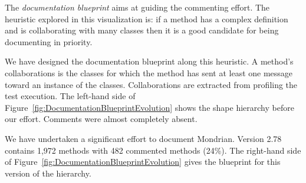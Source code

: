 \documentclass[runningheads]{llncs}
\newcommand{\figref}[1]{Figure~\ref{fig:#1}}
\newcommand{\tablabel}[1]{\label{tab:#1}}
\begin{document}
The \emph{documentation blueprint} aims at guiding the commenting effort. The heuristic explored in this visualization is: if a method has a complex definition and is collaborating with many classes then it is a good candidate for being documenting in priority.

We have designed the documentation blueprint along this heuristic. A method's collaborations is the classes for which the method has sent at least one message toward an instance of the classes. Collaborations are extracted from profiling the test execution.
The left-hand side of \figref{DocumentationBlueprintEvolution} shows the shape hierarchy before our effort. Comments were almost completely absent.

We have undertaken a significant effort to document Mondrian. Version 2.78 contains 1,972 methods with 482 commented methods (24\%). The right-hand side of \figref{DocumentationBlueprintEvolution} gives the blueprint for this version of the hierarchy.


%
%
\end{document}

